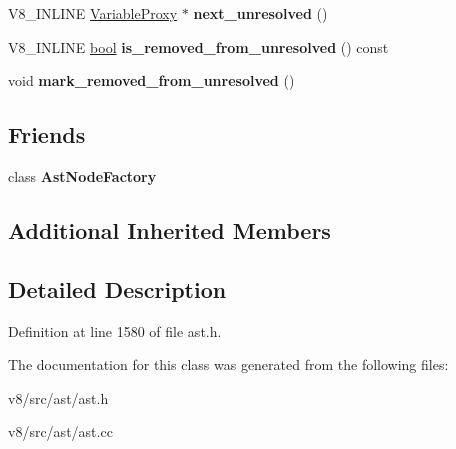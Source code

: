 \begin{DoxyCompactItemize}
\item 
\mbox{\label{classv8_1_1internal_1_1VariableProxy_a1c18fe17f5d67a7f44132a2f64e343ee}} 
V8\+\_\+\+I\+N\+L\+I\+NE \mbox{\hyperlink{classv8_1_1internal_1_1VariableProxy}{Variable\+Proxy}} $\ast$ {\bfseries next\+\_\+unresolved} ()
\item 
\mbox{\label{classv8_1_1internal_1_1VariableProxy_ad91f6a2d19b4b2cb1bbe38f005080ff2}} 
V8\+\_\+\+I\+N\+L\+I\+NE \mbox{\hyperlink{classbool}{bool}} {\bfseries is\+\_\+removed\+\_\+from\+\_\+unresolved} () const
\item 
\mbox{\label{classv8_1_1internal_1_1VariableProxy_a30bc7e45c752b94008efa2ef33f65364}} 
void {\bfseries mark\+\_\+removed\+\_\+from\+\_\+unresolved} ()
\end{DoxyCompactItemize}
\subsection*{Friends}
\begin{DoxyCompactItemize}
\item 
\mbox{\label{classv8_1_1internal_1_1VariableProxy_a8d587c8ad3515ff6433eb83c578e795f}} 
class {\bfseries Ast\+Node\+Factory}
\end{DoxyCompactItemize}
\subsection*{Additional Inherited Members}


\subsection{Detailed Description}


Definition at line 1580 of file ast.\+h.



The documentation for this class was generated from the following files\+:\begin{DoxyCompactItemize}
\item 
v8/src/ast/ast.\+h\item 
v8/src/ast/ast.\+cc\end{DoxyCompactItemize}

